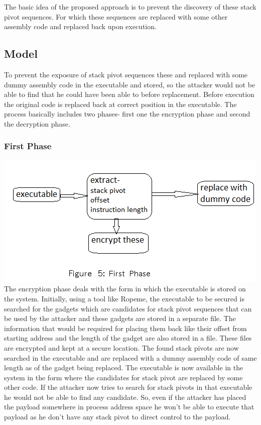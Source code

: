 \documentclass{article}
\begin{document}
\begin{multicols}{2}
	The basic idea of the proposed approach is to prevent the discovery of these stack pivot sequences. For which these sequences are replaced with some other assembly code and replaced back upon execution.
	
	\subsection{Model}
	To prevent the exposure of stack pivot sequences these and replaced with some dummy assembly code in the executable and stored, so the attacker would not be able to find that he could have been able to before replacement. Before execution the original code is replaced back at correct position in the executable. The process basically includes two phases- first one the encryption phase and second the decryption phase.\break
	
	\subsubsection{First Phase}
	\includegraphics[scale=.5]{phase1.png}\break
	The encryption phase deals with the form in which the executable is stored on the system. Initially, using a tool like Ropeme\cite{ropeme}, the executable to be secured is searched for the gadgets which are candidates for stack pivot sequences that can be used by the attacker and these gadgets are stored in a separate file. The information that would be required for placing them back like their offset from starting address and the length of the gadget are also stored in a file. These files are encrypted and kept at a secure location. The found stack pivots are now searched in the executable and are replaced with a dummy assembly code of same length as of the gadget being replaced. The executable is now available in the system in the form where the candidates for stack pivot are replaced by some other code. If the attacker now tries to search for stack pivots in that executable he would not be able to find any candidate. So, even if the attacker has placed the payload somewhere in process address space he won't be able to execute that payload as he don't have any stack pivot to direct control to the payload.
	

\end{multicols}
\end{document}
